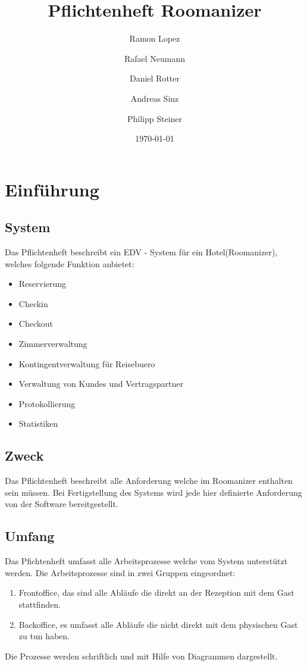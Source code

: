 \documentclass[10pt,a4paper,titlepage]{article}
\begin{document}
\fancyhf{}

\lhead{\leftmark}

\setcounter{secnumdepth}{5}
\setcounter{tocdepth}{3}

\title{Pflichtenheft Roomanizer}
\author{Ramon Lopez \and Rafael Neumann \and Daniel Rotter \and Andreas Sinz \and Philipp Steiner}
\date{\today}
\maketitle

\tableofcontents
\newpage

\section{Einführung}
\subsection{System}
Das Pflichtenheft beschreibt ein EDV - System für ein Hotel(Roomanizer), welches 
folgende Funktion anbietet:
\begin{itemize}
	\item \Gls{Reservierung}
	\item \Gls{Checkin}
	\item \Gls{Checkout}
	\item Zimmerverwaltung
	\item Kontingentverwaltung für \Gls{Reisebuero}
	\item Verwaltung von \Glspl{Kunde} und \Gls{Vertragspartner}
	\item Protokollierung
	\item Statistiken
\end{itemize}
\subsection{Zweck}
Das Pflichtenheft beschreibt alle Anforderung welche im Roomanizer enthalten sein müssen. Bei Fertigstellung des Systems wird jede hier definierte Anforderung von der Software bereitgestellt.
\subsection{Umfang}
Das Pfichtenheft umfasst alle Arbeitsprozesse welche vom System unterstützt werden. 
Die Arbeitsprozesse sind in zwei Gruppen eingeordnet:
\begin{enumerate}
\item \Gls{Frontoffice}, das sind alle Abläufe die direkt an der \Gls{Rezeption} mit dem \Gls{Gast} stattfinden.
\item \Gls{Backoffice}, es umfasst alle Abläufe die nicht direkt mit dem physischen \Gls{Gast} zu tun haben.
\end{enumerate}
Die Prozesse werden schriftlich und mit Hilfe von Diagrammen dargestellt.
\end{document}
